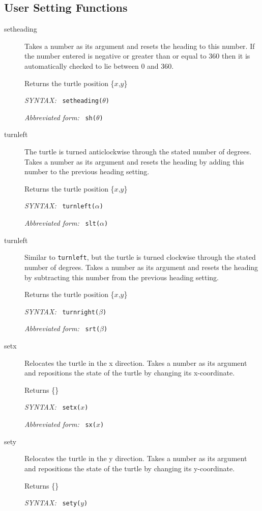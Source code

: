 \documentclass[11pt]{article}
\newcommand{\syntax}{\textsl{SYNTAX: }}
\newcommand{\abb}{\textsl{Abbreviated form: }}
\begin{document}
\subsection{User Setting Functions}
\begin{description}
 \item[setheading] Takes a number as its argument and resets the heading
       to this number. If the number entered is negative or greater than
       or equal to 360 then it is automatically checked to lie between 0
       and 360.

       Returns the turtle position \{$x$,$y$\}

       \syntax\ {\tt setheading($\theta$)}

       \abb\ {\tt sh($\theta$)}
 \item[turnleft]  The turtle is turned anticlockwise through the
       stated number of degrees. Takes a number as its argument and
       resets the heading by adding this number to the previous heading
       setting.

       Returns the turtle position \{$x$,$y$\}

       \syntax\ {\tt turnleft($\alpha$)}

       \abb\ {\tt slt($\alpha$)}
 \item[turnleft] Similar to {\tt turnleft}, but the turtle is turned
       clockwise through the stated number of degrees. Takes a number as
       its argument and resets the heading by subtracting this number from
       the previous heading setting.

       Returns the turtle position \{$x$,$y$\}

       \syntax\ {\tt turnright($\beta$)}

       \abb\ {\tt srt($\beta$)}
 \item[setx] Relocates the turtle in the x direction. Takes a number as
       its argument and repositions the state of the turtle by changing its
       x-coordinate.

       Returns \{\}

       \syntax\ {\tt setx($x$)}

       \abb\ {\tt sx($x$)}
 \item[sety] Relocates the turtle in the y direction. Takes a number as   
       its argument and repositions the state of the turtle by changing its
       y-coordinate.

       Returns \{\}

       \syntax\ {\tt sety($y$)}


\end{description}
\end{document}
